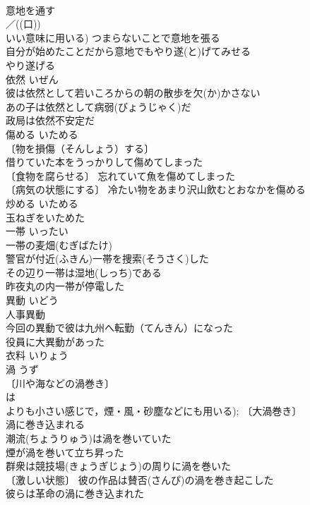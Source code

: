 \documentclass[8pt]{extreport}
\begin{document}
\begin{CJK}{UTF8}{min}
\\	意地を通す 
\\	／((口)) 
\\	いい意味に用いる) つまらないことで意地を張る 
\\	自分が始めたことだから意地でもやり遂(と)げてみせる 
\\	やり遂げる 
\\	依然	いぜん	
\\	彼は依然として若いころからの朝の散歩を欠(か)かさない 
\\	あの子は依然として病弱(びょうじゃく)だ 
\\	政局は依然不安定だ 
\\	傷める	いためる	
\\	〔物を損傷（そんしょう）する〕
\\	借りていた本をうっかりして傷めてしまった 
\\	〔食物を腐らせる〕 忘れていて魚を傷めてしまった 
\\	〔病気の状態にする〕 冷たい物をあまり沢山飲むとおなかを傷める 
\\	炒める	いためる	
\\	玉ねぎをいためた 
\\	一帯	いったい	
\\	一帯の麦畑(むぎばたけ) 
\\	警官が付近(ふきん)一帯を捜索(そうさく)した 
\\	その辺り一帯は湿地(しっち)である 
\\	昨夜丸の内一帯が停電した 
\\	異動	いどう	
\\	人事異動 
\\	今回の異動で彼は九州へ転勤（てんきん）になった 
\\	役員に大異動があった 
\\	衣料	いりょう	
\\	渦	うず	
\\	〔川や海などの渦巻き〕
\\	は
\\	よりも小さい感じで，煙・風・砂塵などにも用いる); 〔大渦巻き〕
\\	渦に巻き込まれる 
\\	潮流(ちょうりゅう)は渦を巻いていた 
\\	煙が渦を巻いて立ち昇った 
\\	群衆は競技場(きょうぎじょう)の周りに渦を巻いた 
\\	〔激しい状態〕 彼の作品は賛否(さんぴ)の渦を巻き起こした 
\\	彼らは革命の渦に巻き込まれた 

\end{CJK}
\end{document}
